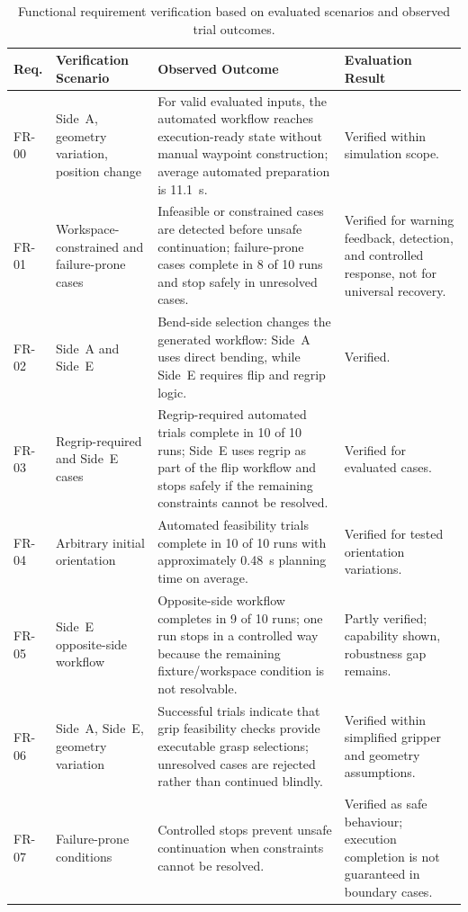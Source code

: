\begin{table}[htbp]
\centering
\normalsize
\setlength{\tabcolsep}{3pt}
\renewcommand{\arraystretch}{1.12}

\begin{tabularx}{\textwidth}{L{1.6cm} L{3.6cm} Y L{3.2cm}}
\hline
\textbf{Req.} & \textbf{Verification Scenario} & \textbf{Observed Outcome} & \textbf{Evaluation Result} \\
\hline
FR-00 & Side~A, geometry variation, position change & For valid evaluated inputs, the automated workflow reaches execution-ready state without manual waypoint construction; average automated preparation is \SI{11.1}{\second}. & Verified within simulation scope. \\
\hline
FR-01 & Workspace-constrained and failure-prone cases & Infeasible or constrained cases are detected before unsafe continuation; failure-prone cases complete in 8 of 10 runs and stop safely in unresolved cases. & Verified for warning feedback, detection, and controlled response, not for universal recovery. \\
\hline
FR-02 & Side~A and Side~E & Bend-side selection changes the generated workflow: Side~A uses direct bending, while Side~E requires flip and regrip logic. & Verified. \\
\hline
FR-03 & Regrip-required and Side~E cases & Regrip-required automated trials complete in 10 of 10 runs; Side~E uses regrip as part of the flip workflow and stops safely if the remaining constraints cannot be resolved. & Verified for evaluated cases. \\
\hline
FR-04 & Arbitrary initial orientation & Automated feasibility trials complete in 10 of 10 runs with approximately \SI{0.48}{\second} planning time on average. & Verified for tested orientation variations. \\
\hline
FR-05 & Side~E opposite-side workflow & Opposite-side workflow completes in 9 of 10 runs; one run stops in a controlled way because the remaining fixture/workspace condition is not resolvable. & Partly verified; capability shown, robustness gap remains. \\
\hline
FR-06 & Side~A, Side~E, geometry variation & Successful trials indicate that grip feasibility checks provide executable grasp selections; unresolved cases are rejected rather than continued blindly. & Verified within simplified gripper and geometry assumptions. \\
\hline
FR-07 & Failure-prone conditions & Controlled stops prevent unsafe continuation when constraints cannot be resolved. & Verified as safe behaviour; execution completion is not guaranteed in boundary cases. \\
\hline
\end{tabularx}

\caption{Functional requirement verification based on evaluated scenarios and observed trial outcomes.}
\label{tab:ch6-functional-verification}
\end{table}
